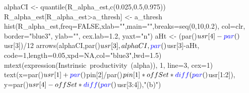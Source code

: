 \documentclass[
  11pt,
]{article}
\newenvironment{Shaded}{}{}
\newcommand{\DataTypeTok}[1]{#1}
\newcommand{\DecValTok}[1]{#1}
\newcommand{\FloatTok}[1]{#1}
\newcommand{\KeywordTok}[1]{\textcolor[rgb]{0.00,0.00,1.00}{#1}}
\newcommand{\NormalTok}[1]{#1}
\newcommand{\OperatorTok}[1]{#1}
\newcommand{\OtherTok}[1]{\textcolor[rgb]{1.00,0.25,0.00}{#1}}
\newcommand{\StringTok}[1]{\textcolor[rgb]{0.00,0.50,0.50}{#1}}
\begin{document}
\begin{Shaded}
\begin{Highlighting}[]
\NormalTok{alphaCI <-}\StringTok{ }\KeywordTok{quantile}\NormalTok{(R_alpha_est,}\KeywordTok{c}\NormalTok{(}\FloatTok{0.025}\NormalTok{,}\FloatTok{0.5}\NormalTok{,}\FloatTok{0.975}\NormalTok{))}
\NormalTok{R_alpha_est[R_alpha_est}\OperatorTok{>}\NormalTok{a_thresh] <-}\StringTok{ }\NormalTok{a_thresh}
\KeywordTok{hist}\NormalTok{(R_alpha_est,}\DataTypeTok{freq=}\OtherTok{FALSE}\NormalTok{,}\DataTypeTok{xlab=}\StringTok{""}\NormalTok{,}\DataTypeTok{main=}\StringTok{""}\NormalTok{,}\DataTypeTok{breaks=}\KeywordTok{seq}\NormalTok{(}\DecValTok{0}\NormalTok{,}\DecValTok{10}\NormalTok{,}\FloatTok{0.2}\NormalTok{),}
     \DataTypeTok{col=}\NormalTok{clr, }\DataTypeTok{border=}\StringTok{"blue3"}\NormalTok{, }\DataTypeTok{ylab=}\StringTok{""}\NormalTok{, }\DataTypeTok{cex.lab=}\FloatTok{1.2}\NormalTok{, }\DataTypeTok{yaxt=}\StringTok{"n"}\NormalTok{)}
\NormalTok{aHt <-}\StringTok{ }\NormalTok{(}\KeywordTok{par}\NormalTok{()}\OperatorTok{$}\NormalTok{usr[}\DecValTok{4}\NormalTok{]}\OperatorTok{-}\KeywordTok{par}\NormalTok{()}\OperatorTok{$}\NormalTok{usr[}\DecValTok{3}\NormalTok{])}\OperatorTok{/}\DecValTok{12}
\KeywordTok{arrows}\NormalTok{(alphaCI,}\KeywordTok{par}\NormalTok{()}\OperatorTok{$}\NormalTok{usr[}\DecValTok{3}\NormalTok{],alphaCI,}\KeywordTok{par}\NormalTok{()}\OperatorTok{$}\NormalTok{usr[}\DecValTok{3}\NormalTok{]}\OperatorTok{-}\NormalTok{aHt,}
       \DataTypeTok{code=}\DecValTok{1}\NormalTok{,}\DataTypeTok{length=}\FloatTok{0.05}\NormalTok{,}\DataTypeTok{xpd=}\OtherTok{NA}\NormalTok{,}\DataTypeTok{col=}\StringTok{"blue3"}\NormalTok{,}\DataTypeTok{lwd=}\FloatTok{1.5}\NormalTok{)}
\KeywordTok{mtext}\NormalTok{(}\KeywordTok{expression}\NormalTok{(Instrinsic}\OperatorTok{~}\NormalTok{productivity}\OperatorTok{~}\NormalTok{(alpha)), }\DecValTok{1}\NormalTok{, }\DataTypeTok{line=}\DecValTok{3}\NormalTok{, }\DataTypeTok{cex=}\DecValTok{1}\NormalTok{)}
\KeywordTok{text}\NormalTok{(}\DataTypeTok{x=}\KeywordTok{par}\NormalTok{()}\OperatorTok{$}\NormalTok{usr[}\DecValTok{1}\NormalTok{]}\OperatorTok{+}\KeywordTok{par}\NormalTok{()}\OperatorTok{$}\NormalTok{pin[}\DecValTok{2}\NormalTok{]}\OperatorTok{/}\KeywordTok{par}\NormalTok{()}\OperatorTok{$}\NormalTok{pin[}\DecValTok{1}\NormalTok{]}\OperatorTok{*}\NormalTok{offSet}\OperatorTok{*}\KeywordTok{diff}\NormalTok{(}\KeywordTok{par}\NormalTok{()}\OperatorTok{$}\NormalTok{usr[}\DecValTok{1}\OperatorTok{:}\DecValTok{2}\NormalTok{]),}
     \DataTypeTok{y=}\KeywordTok{par}\NormalTok{()}\OperatorTok{$}\NormalTok{usr[}\DecValTok{4}\NormalTok{]}\OperatorTok{-}\NormalTok{offSet}\OperatorTok{*}\KeywordTok{diff}\NormalTok{(}\KeywordTok{par}\NormalTok{()}\OperatorTok{$}\NormalTok{usr[}\DecValTok{3}\OperatorTok{:}\DecValTok{4}\NormalTok{]),}\StringTok{"(b)"}\NormalTok{)}



\end{Highlighting}
\end{Shaded}
\end{document}
